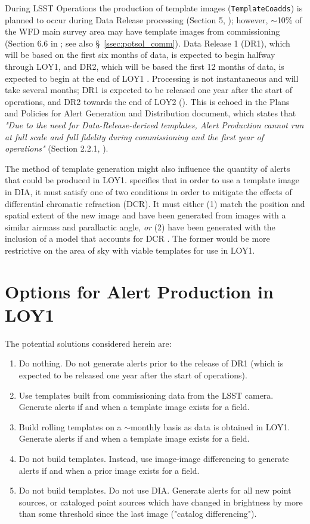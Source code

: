 \documentclass[DM,lsstdraft,toc]{lsstdoc}
\begin{document}
During LSST Operations the production of template images ({\tt TemplateCoadds}) is planned to occur during Data Release processing (Section 5, ); however, $\sim$10\% of the WFD main survey area may have template images from commissioning (Section 6.6 in ; see also \S~\ref{ssec:potsol_comm}).
Data Release 1 (DR1), which will be based on the first six months of data, is expected to begin halfway through LOY1, and DR2, which will be based the first 12 months of data, is expected to begin at the end of LOY1 .
Processing is not instantaneous and will take several months; DR1 is expected to be released one year after the start of operations, and DR2 towards the end of LOY2 (). 
This is echoed in the Plans and Policies for Alert Generation and Distribution document, which states that {\it "Due to the need for Data-Release-derived templates, Alert Production cannot run at full scale and full fidelity during commissioning and the first year of operations"} (Section 2.2.1, ). 

The method of template generation might also influence the quantity of alerts that could be produced in LOY1.
 specifies that in order to use a template image in DIA, it must satisfy one of two conditions in order to mitigate the effects of differential chromatic refraction (DCR).
It must either (1) match the position and spatial extent of the new image and have been generated from images with a similar airmass and parallactic angle, {\em or} (2) have been generated with the inclusion of a model that accounts for DCR .
The former would be more restrictive on the area of sky with viable templates for use in LOY1.

\clearpage
\section{Options for Alert Production in LOY1}\label{sec:potsol}

The potential solutions considered herein are:
\begin{enumerate}
\item Do nothing. Do not generate alerts prior to the release of DR1 (which is expected to be released one year after the start of operations).
\item Use templates built from commissioning data from the LSST camera. Generate alerts if and when a template image exists for a field. 
\item Build rolling templates on a $\sim$monthly basis as data is obtained in LOY1. Generate alerts if and when a template image exists for a field.
\item Do not build templates. Instead, use image-image differencing to generate alerts if and when a prior image exists for a field.
\item Do not build templates. Do not use DIA. Generate alerts for all new point sources, or cataloged point sources which have changed in brightness by more than some threshold since the last image ("catalog differencing").
\end{enumerate}
\end{document}

